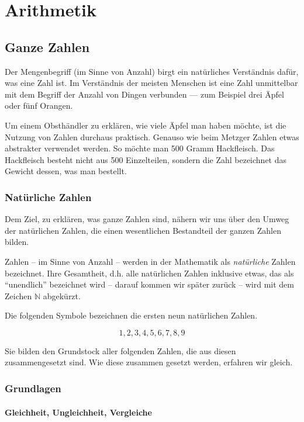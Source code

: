 
\part{Arithmetik}

\chapter{Ganze Zahlen}

Der Mengenbegriff (im Sinne von Anzahl) birgt ein natürliches Verständnis dafür, was eine Zahl ist. Im Verständnis der meisten Menschen ist eine Zahl unmittelbar mit dem Begriff der Anzahl von Dingen verbunden --- zum Beispiel drei Äpfel oder fünf Orangen.

Um einem Obsthändler zu erklären, wie viele Äpfel man haben möchte, ist die Nutzung von Zahlen durchaus praktisch. Genauso wie beim Metzger Zahlen etwas abstrakter verwendet werden. So möchte man 500 Gramm Hackfleisch. Das Hackfleisch besteht nicht aus 500 Einzelteilen, sondern die Zahl bezeichnet das Gewicht dessen, was man bestellt.

\section{Natürliche Zahlen}

Dem Ziel, zu erklären, was ganze Zahlen sind, nähern wir uns über den Umweg der natürlichen Zahlen, die einen wesentlichen Bestandteil der ganzen Zahlen bilden. 


\begin{definition}
Zahlen -- im Sinne von Anzahl -- werden in der Mathematik als \textsl{natürliche} Zahlen bezeichnet. Ihre Gesamtheit, d.h. alle natürlichen Zahlen inklusive etwas, das als "`unendlich"' bezeichnet wird -- darauf kommen wir später zurück -- wird mit dem Zeichen $\mathbb{N}$ abgekürzt.
\end{definition}

Die folgenden Symbole bezeichnen die ersten neun natürlichen Zahlen. 

\[ 
1, 2, 3, 4, 5, 6, 7, 8, 9
\]

Sie bilden den Grundstock aller folgenden Zahlen, die aus diesen zusammengesetzt sind. Wie diese zusammen gesetzt werden, erfahren wir gleich.

\section{Grundlagen}

\subsection{Gleichheit, Ungleichheit, Vergleiche}

